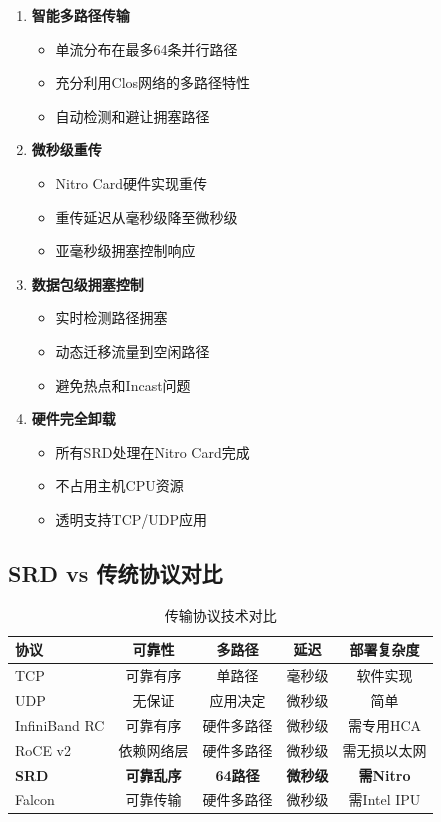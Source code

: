 \begin{enumerate}
    \item \textbf{智能多路径传输}
    \begin{itemize}
        \item 单流分布在最多64条并行路径
        \item 充分利用Clos网络的多路径特性
        \item 自动检测和避让拥塞路径
    \end{itemize}
    
    \item \textbf{微秒级重传}
    \begin{itemize}
        \item Nitro Card硬件实现重传
        \item 重传延迟从毫秒级降至微秒级
        \item 亚毫秒级拥塞控制响应
    \end{itemize}
    
    \item \textbf{数据包级拥塞控制}
    \begin{itemize}
        \item 实时检测路径拥塞
        \item 动态迁移流量到空闲路径
        \item 避免热点和Incast问题
    \end{itemize}
    
    \item \textbf{硬件完全卸载}
    \begin{itemize}
        \item 所有SRD处理在Nitro Card完成
        \item 不占用主机CPU资源
        \item 透明支持TCP/UDP应用
    \end{itemize}
\end{enumerate}

\subsection{SRD vs 传统协议对比}

\begin{table}[htbp]
\centering
\caption{传输协议技术对比}
\begin{tabular}{@{}lcccc@{}}
\toprule
\textbf{协议} & \textbf{可靠性} & \textbf{多路径} & \textbf{延迟} & \textbf{部署复杂度} \\
\midrule
TCP & 可靠有序 & 单路径 & 毫秒级 & 软件实现 \\
UDP & 无保证 & 应用决定 & 微秒级 & 简单 \\
InfiniBand RC & 可靠有序 & 硬件多路径 & 微秒级 & 需专用HCA \\
RoCE v2 & 依赖网络层 & 硬件多路径 & 微秒级 & 需无损以太网 \\
\textbf{SRD} & \textbf{可靠乱序} & \textbf{64路径} & \textbf{微秒级} & \textbf{需Nitro} \\
Falcon & 可靠传输 & 硬件多路径 & 微秒级 & 需Intel IPU \\
\bottomrule
\end{tabular}
\end{table}

